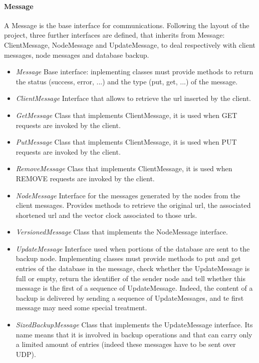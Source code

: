 \documentclass{article}
\begin{document}
\paragraph{Message} A Message is the base interface for communications. Following the layout of the project, three further interfaces are defined, that inherits from Message: ClientMessage, NodeMessage and UpdateMessage, to deal respectively with client messages, node messages and database backup. 
\begin{itemize}
\item \textit{Message} Base interface: inplementing classes must provide methods to return the status (success, error, ...) and the type (put, get, ...) of the message.
\item \textit{ClientMessage} Interface that allows to retrieve the url inserted by the client.
\item \textit{GetMessage} Class that implements ClientMessage, it is used when GET requests are invoked by the client.
\item \textit{PutMessage} Class that implements ClientMessage, it is used when PUT requests are invoked by the client.
\item \textit{RemoveMessage} Class that implements ClientMessage, it is used when REMOVE requests are invoked by the client.
\item \textit{NodeMessage} Interface for the messages generated by the nodes from the client messages. Provides methods to retrieve the original url, the associated shortened url and the vector clock associated to those urls.
\item \textit{VersionedMessage} Class that implements the NodeMessage interface.
\item \textit{UpdateMessage} Interface used when portions of the database are sent to the backup node. Implementing classes must provide methods to put and get entries of the database in the message, check whether the UpdateMessage is full or empty, return the identifier of the sender node and tell whether this message is the first of a sequence of UpdateMessage. Indeed, the content of a backup is delivered by sending a sequence of UpdateMessages, and te first message may need some special treatment.
\item \textit{SizedBackupMessage} Class that implements the UpdateMessage interface. Its name means that it is involved in backup operations and that can carry only a limited amount of entries (indeed these messages have to be sent over UDP).
\end{itemize}
\end{document}
